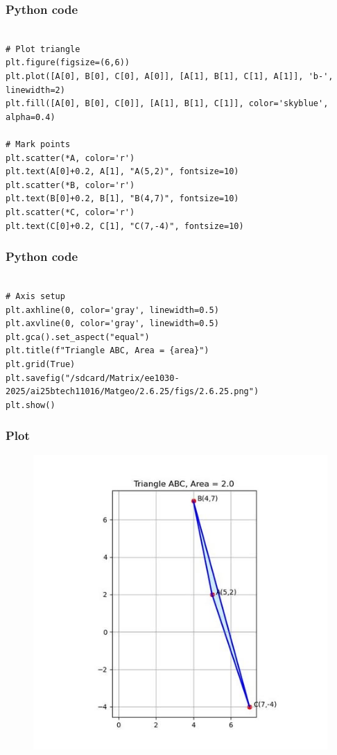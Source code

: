 \documentclass{beamer}
\begin{document}
\begin{frame}[fragile]
    \frametitle{Python code}
    \begin{lstlisting}

# Plot triangle
plt.figure(figsize=(6,6))
plt.plot([A[0], B[0], C[0], A[0]], [A[1], B[1], C[1], A[1]], 'b-', linewidth=2)
plt.fill([A[0], B[0], C[0]], [A[1], B[1], C[1]], color='skyblue', alpha=0.4)

# Mark points
plt.scatter(*A, color='r')
plt.text(A[0]+0.2, A[1], "A(5,2)", fontsize=10)
plt.scatter(*B, color='r')
plt.text(B[0]+0.2, B[1], "B(4,7)", fontsize=10)
plt.scatter(*C, color='r')
plt.text(C[0]+0.2, C[1], "C(7,-4)", fontsize=10)
\end{lstlisting}
\end{frame}
\begin{frame}[fragile]
    \frametitle{Python code}
    \begin{lstlisting}

# Axis setup
plt.axhline(0, color='gray', linewidth=0.5)
plt.axvline(0, color='gray', linewidth=0.5)
plt.gca().set_aspect("equal")
plt.title(f"Triangle ABC, Area = {area}")
plt.grid(True)
plt.savefig("/sdcard/Matrix/ee1030-2025/ai25btech11016/Matgeo/2.6.25/figs/2.6.25.png")
plt.show()
\end{lstlisting}
\end{frame}
\begin{frame}[fragile]
    \frametitle{Plot}
   
\begin{figure}[h]
    \centering
    \includegraphics[scale=0.5]{figs/2.6.25.jpg}
    \caption{}
    \label{fig:1}
\end{figure}

    
\end{frame}
\end{document}
